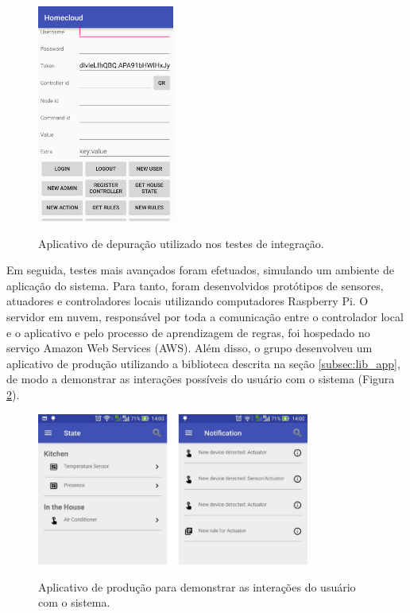 \begin{figure}[h]
	\centering
	\caption{Aplicativo de depuração utilizado nos testes de integração.}
  \includegraphics[width=0.4\textwidth]{imagens/aplicativo_teste.png}
  \label{fig:aplicativo_teste}  
\end{figure}

Em seguida, testes mais avançados foram efetuados, simulando um ambiente de aplicação do sistema. Para tanto, foram desenvolvidos protótipos de sensores, atuadores e controladores locais utilizando computadores Raspberry Pi. O servidor em nuvem, responsável por toda a comunicação entre o controlador local e o aplicativo e pelo processo de aprendizagem de regras, foi hospedado no serviço Amazon Web Services (AWS). Além disso, o grupo desenvolveu um aplicativo de produção utilizando a biblioteca descrita na seção \ref{subsec:lib_app}, de modo a demonstrar as interações possíveis do usuário com o sistema (Figura \ref{fig:app_screenshot}).

\begin{figure}[h]
	\centering
	\caption{Aplicativo de produção para demonstrar as interações do usuário com o sistema.}
  \includegraphics[width=0.8\textwidth]{imagens/app_screenshot.png}
  \label{fig:app_screenshot}  
\end{figure}